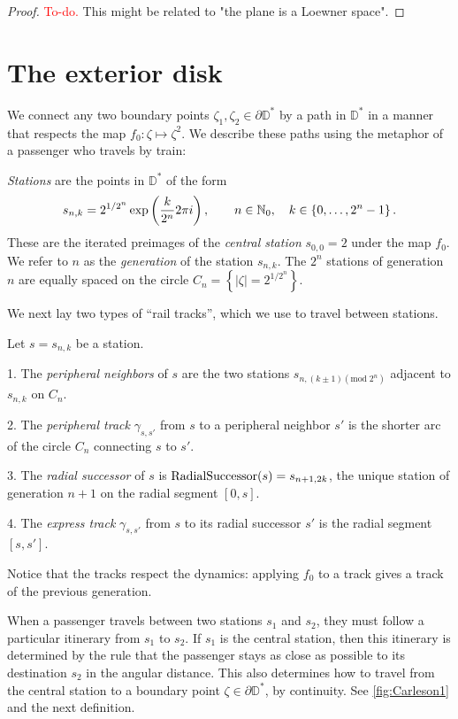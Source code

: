 \begin{proof}
	\textcolor{red}{To-do.} This might be related to "the plane is a Loewner space".
\end{proof}
	 
\section{The exterior disk}

We connect any two boundary points $\zeta_1, \zeta_2 \in \partial \mathbb D^*$ by a path in $\mathbb D^*$ in a manner that respects the map 
$f_0: \zeta \mapsto \zeta^2$.
We describe these paths using the metaphor of a passenger who travels by train:

\begin{definition}
\emph{Stations} are the points in $\mathbb D ^*$ of the form 
$$
s_{n,k}=2^{1/2^{n}} \exp\left(\frac{k}{2^{n}}2\pi i\right),\qquad n\in\mathbb{N}_{0},\quad k\in\left\{ 0,\ldots,2^{n}-1\right\}.
$$ 
These are the iterated preimages of the \emph{central station} $s_{0,0} = 2$ under the map $f_{0}$.
We refer to $n$ as the \emph{generation} of the station $s_{n,k}$. 
The $2^{n}$ stations of generation $n$ are equally spaced on the circle $C_{n}=\left\{ \left|\zeta\right|=2^{1/2^{n}}\right\} $. 
\end{definition}

We next lay two types of \enquote{rail tracks}, which we use to travel between stations.

\begin{definition}
Let $s=s_{n,k}$ be a station.

1. The \emph{peripheral neighbors} of $s$ are the two stations $s_{n,\left(k\pm1\right) (\mathrm{mod}\; 2^{n})}$ adjacent to $s_{n,k}$ on $C_{n}$.

2. The \emph{peripheral track }$\gamma_{s,s'}$ from $s$ to a peripheral neighbor $s'$
is the shorter arc of the circle $C_{n}$ connecting $s$ to $s'$.

3. The \emph{radial successor} of $s$ is $\operatorname{RadialSuccessor}(s)=s_{n+1,2k}$, the unique station of generation $n+1$ on the radial segment $[0,s]$.

4. The \emph{express track} $\gamma_{s,s'}$ from $s$ to its radial successor $s'$ is the radial segment $[s,s']$.
\end{definition}
Notice that the tracks respect the dynamics: applying $f_0$ to a track gives a track of the previous generation.

When a passenger travels between two stations $s_1$ and $s_2$, they must follow a particular itinerary from $s_1$ to $s_2$.
If $s_1$ is the central station, then this itinerary is determined by the rule that the passenger stays as close as possible to its destination $s_2$ in the angular distance.
This also determines how to travel from the central station to a boundary point $\zeta\in \partial \mathbb D^*$, by continuity. 
See \cref{fig:Carleson1} and the next definition.


